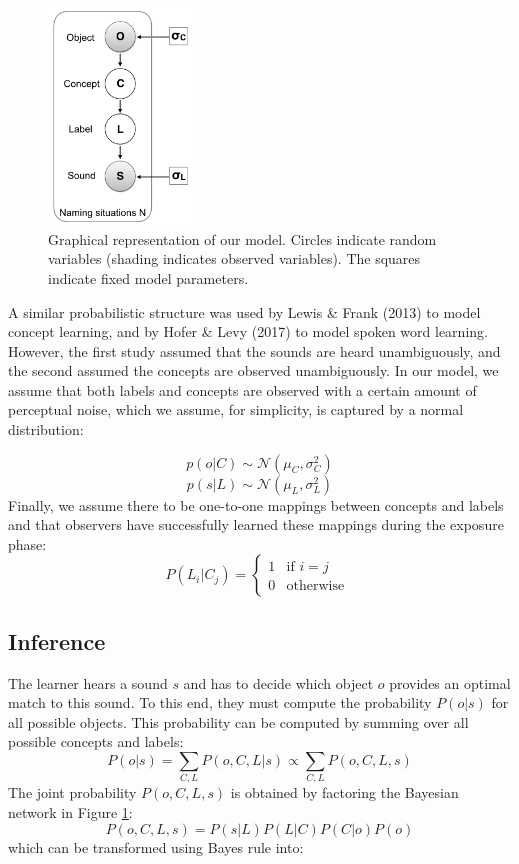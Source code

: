 \documentclass[10pt, letterpaper]{article}
\begin{document}
\begin{figure}
\centering
\includegraphics[width=1.5in]{figs/model.png}
\caption{Graphical representation of our model. Circles indicate random variables (shading indicates observed variables). The squares indicate fixed model parameters.}
\label{fig:model}
\end{figure}

A similar probabilistic structure was used by Lewis \& Frank (2013) to
model concept learning, and by Hofer \& Levy (2017) to model spoken word
learning. However, the first study assumed that the sounds are heard
unambiguously, and the second assumed the concepts are observed
unambiguously. In our model, we assume that both labels and concepts are
observed with a certain amount of perceptual noise, which we assume, for
simplicity, is captured by a normal distribution:

\[ p(o | C) \sim  \mathcal{N}(\mu_C, \sigma^2_C) \]
\[ p(s| L) \sim  \mathcal{N}(\mu_L, \sigma^2_L) \] Finally, we assume
there to be one-to-one mappings between concepts and labels and that
observers have successfully learned these mappings during the exposure
phase: \[
P(L_i|C_j) = 
\begin{cases}
  1 & \text{if  }  i=j \\  
  0  & \text{otherwise  }
\end{cases}
\]

\subsection{Inference}\label{inference}

The learner hears a sound \(s\) and has to decide which object \(o\)
provides an optimal match to this sound. To this end, they must compute
the probability \(P(o|s)\) for all possible objects. This probability
can be computed by summing over all possible concepts and labels:
\[P(o|s)=\sum_{C,L} P(o, C, L| s) \propto \sum_{C,L} P(o, C, L, s) \]
The joint probability \(P(o, C, L, s)\) is obtained by factoring the
Bayesian network in Figure \ref{fig:model}:
\[P(o,C,L,s) = P(s|L)P(L|C)P(C|o)P(o) \] which can be transformed using
Bayes rule into:
\end{document}
